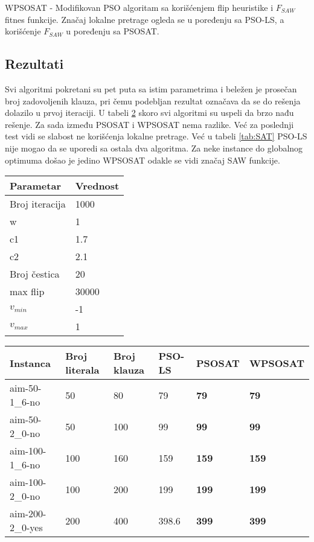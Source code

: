 \documentclass{article}
\begin{document}
WPSOSAT - Modifikovan PSO algoritam sa korišćenjem flip heuristike i $F_{SAW}$ fitnes funkcije. Značaj lokalne pretrage ogleda se u poređenju sa PSO-LS, a korišćenje $F_{SAW}$ u poređenju sa PSOSAT.\\

\subsection{Rezultati}
Svi algoritmi pokretani su pet puta sa istim parametrima i beležen je prosečan broj zadovoljenih klauza, pri čemu podebljan rezultat označava da se do rešenja dolazilo u prvoj iteraciji. U tabeli \ref{tab:UNSAT} skoro svi algoritmi su uspeli da brzo nađu rešenje. Za sada između PSOSAT i WPSOSAT nema razlike. Već za poslednji test vidi se slabost ne korišćenja lokalne pretrage. Već u tabeli \ref{tab:SAT} PSO-LS nije mogao da se uporedi sa ostala dva algoritma. Za neke instance do globalnog optimuma došao je jedino WPSOSAT odakle se vidi značaj SAW funkcije.

\begin{table}
\centering
\begin{tabular}{ |p{3cm}|p{2cm}| }
 \hline
 Parametar 	& Vrednost\\
 \hline
 Broj iteracija & 1000 \\
 \hline
 w 				& 1\\
 \hline
 c1 			& 1.7\\
 \hline
 c2				& 2.1\\ 
 \hline
 Broj čestica	& 20\\
 \hline
 max flip & 30000 \\
 \hline
 $v_{min}$ 		& -1\\
 \hline
 $v_{max}$		& 1\\ 
 \hline
\end{tabular}
\label{tab:parametri} 
\end{table}


\begin{table}
\centering
\begin{tabular}{ |p{3cm}|p{2cm}|p{2cm}||p{2cm}|p{2cm}|p{2cm}| }
 \hline
 Instanca & Broj literala & Broj klauza & PSO-LS & PSOSAT & WPSOSAT\\
 \hline
 aim-50-1\_6-no & 50 & 80 & 79 & \textbf{79} & \textbf{79}\\
 \hline
 aim-50-2\_0-no & 50 & 100 & 99 & \textbf{99} & \textbf{99}\\
 \hline
 aim-100-1\_6-no & 100 & 160 & 159 & \textbf{159} & \textbf{159}\\
 \hline
 aim-100-2\_0-no & 100 & 200 & 199 & \textbf{199} & \textbf{199}\\
 \hline
 aim-200-2\_0-yes & 200 & 400 & 398.6 & \textbf{399} & \textbf{399}\\
 \hline
\end{tabular}
\label{tab:UNSAT} 
\end{table}
\end{document}
